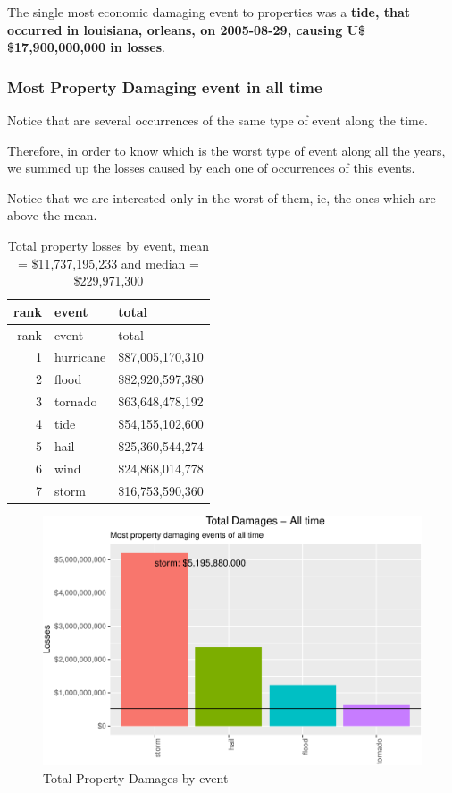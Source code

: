 \documentclass[]{article}
\begin{document}
The single most economic damaging event to properties was a
\textbf{tide, that occurred in louisiana, orleans, on 2005-08-29,
causing U\$ \$17,900,000,000 in losses}.

\subsubsection{Most Property Damaging event in all
time}\label{most-property-damaging-event-in-all-time}

Notice that are several occurrences of the same type of event along the
time.

Therefore, in order to know which is the worst type of event along all
the years, we summed up the losses caused by each one of occurrences of
this events.

Notice that we are interested only in the worst of them, ie, the ones
which are above the mean.

\begin{longtable}[]{@{}rll@{}}
\caption{Total property losses by event, mean = \$11,737,195,233 and
median = \$229,971,300}\tabularnewline
\toprule
rank & event & total\tabularnewline
\midrule
\endfirsthead
\toprule
rank & event & total\tabularnewline
\midrule
\endhead
1 & hurricane & \$87,005,170,310\tabularnewline
2 & flood & \$82,920,597,380\tabularnewline
3 & tornado & \$63,648,478,192\tabularnewline
4 & tide & \$54,155,102,600\tabularnewline
5 & hail & \$25,360,544,274\tabularnewline
6 & wind & \$24,868,014,778\tabularnewline
7 & storm & \$16,753,590,360\tabularnewline
\bottomrule
\end{longtable}

\begin{figure}[htbp]
\centering
\includegraphics{readme_files/figure-latex/prop-all-plot-1.pdf}
\caption{Total Property Damages by event}
\end{figure}
\end{document}
